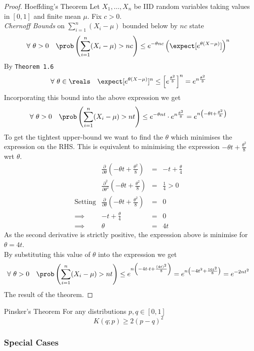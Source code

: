 \documentclass[11pt,a4paper]{article}
\begin{document}
  \begin{proof}{Hoeffding's Theorem}
    Let $X_1,\dots,X_n$ be IID random variables taking values in $[0,1]$ and finite mean $\mu$. Fix $c>0$.\\
    \textit{Chernoff Bounds} on $\sum_{i=1}^n(X_i-\mu)$ bounded below by $nc$ state
    \[ \forall\ \theta>0\quad\prob\left(\sum_{i=1}^n(X_i-\mu)>nc\right)\leq e^{-\theta nc}\left(\expect[e^{\theta(X-\mu)}]\right)^n \]
    By \texttt{Theorem 1.6}
    \[ \forall\ \theta\in\reals\quad\expect[e^{\theta(X-\mu)}]^n\leq\left[e^\frac{\theta^2}8\right]^n=e^{n\frac{\theta^2}8} \]
    Incorporating this bound into the above expression we get
    \[ \forall\ \theta>0\quad\prob\left(\sum_{i=1}^n(X_i-\mu)>nt\right)\leq e^{-\theta nt}\cdot e^{n\frac{\theta^2}8}=e^{n\left(-\theta t+\frac{\theta^2}8\right)} \]
    To get the tightest upper-bound we want to find the $\theta$ which minimises the expression on the RHS.
    This is equivalent to minimising the expression $-\theta t+\frac{\theta^2}8$ wrt $\theta$.
    \[\begin{array}{rrcl}
      &\frac{\partial }{\partial\theta}\left(-\theta t+\frac{\theta^2}8\right)&=&-t+\frac\theta4\\
      &\frac{\partial^2 }{\partial\theta^2}\left(-\theta t+\frac{\theta^2}8\right)&=&\frac14>0\\
      \text{Setting}&\frac{\partial }{\partial\theta}\left(-\theta t+\frac{\theta^2}8\right)&=&0\\
      \implies&-t+\frac\theta4&=&0\\
      \implies&\theta&=&4t
    \end{array}\]
    As the second derivative is strictly positive, the expression above is minimise for $\theta=4t$.\\
    By substituting this value of $\theta$ into the expression we get
    \[ \forall\ \theta>0\quad\prob\left(\sum_{i=1}^n(X_i-\mu)>nt\right)\leq e^{n\left(-4t\cdot t+\frac{(4t)^2}8\right)}=e^{n\left(-4t^2+\frac{16t^2}8\right)}=e^{-2nt^2} \]
    The result of the theorem.\proved
  \end{proof}

  \begin{theorem}{Pinsker's Theorem}
    For any distributions $p,q\in[0,1]$
    \[ K(q;p)\geq2(p-q)^2 \]
  \end{theorem}

\subsubsection{Special Cases}
\end{document}
